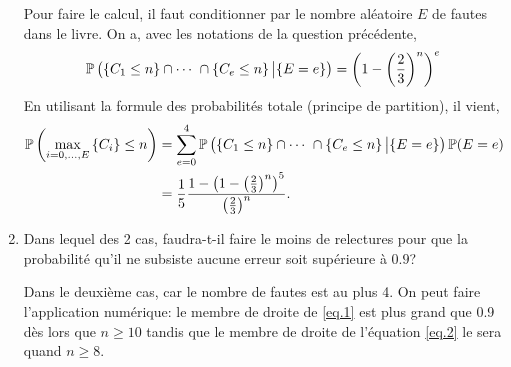 \documentclass[a4paper]{tp_um}
\begin{document}
\begin{enumerate}
        \medskip

         Pour faire le calcul, il faut conditionner par le nombre aléatoire $E$ de fautes dans le livre. On a, avec les notations de la question précédente,
        \[
            \P\left( \{C_1 \leq n\} \cap \cdots \cap \left\{ C_e \leq n \right\} \big| \{E=e\} \right) = \left(1 - \left( \frac 23 \right)^n \right)^e
        \]
        En utilisant la formule des probabilités totale (principe de partition), il vient,
    \begin{align}
            \P\left( \max_{i=0,\ldots,E} \left\{ C_i \right\} \leq n \right) &= \sum_{e=0}^4  \P\left( \{C_1 \leq n\} \cap \cdots \cap \left\{ C_e \leq n\right\} \big| \{E=e\} \right) \P(E=e) \nonumber\\
            &= \frac 15 \frac{ 1 -\left(1 - \left( \frac 23 \right)^n \right)^5}{ \left( \frac 23 \right)^n }. \label{eq.2}
        \end{align}

    \item Dans lequel des 2 cas, faudra-t-il faire le moins de relectures pour que la probabilité qu'il ne subsiste aucune erreur soit supérieure à $0.9$? 

\medskip
Dans le deuxième cas, car le nombre de fautes est au plus 4. On peut faire l'application numérique:  le membre de droite de \ref{eq.1} est plus grand que 0.9 dès lors que $n\geq 10$ tandis que le membre de droite de l'équation \eqref{eq.2} le sera quand  $n \geq 8$. 

\end{enumerate}
\end{document}
